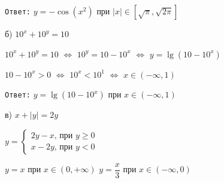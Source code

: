 \documentclass[12pt]{article}
\begin{document}
	{\tt Ответ:} $y=-\cos(x^2)$ при $|x|\in [\sqrt{\pi},\sqrt{2\pi}]$
	
	\quad б) $10^x + 10^y = 10$
	
	$10^x + 10^y = 10$ $\Leftrightarrow$ $10^y = 10-10^x$ $\Leftrightarrow$ $y = \lg (10-10^x)$
	
	$10-10^x>0$ $\Leftrightarrow$ $10^x<10^1$ $\Leftrightarrow$ $x\in (-\infty, 1)$
	
	{\tt Ответ:} $y = \lg(10-10^x)$ при $x\in (-\infty, 1)$
	
	\quad в) $x+|y| = 2y$ 
	
	$
	y = \begin{cases}
		2y -x \text{, при } y\ge 0 \\
		x - 2y \text{, при } y<0	
	\end{cases} 
	$
	
	$y = x$ при $x \in (0, +\infty)$ \quad $y=\dfrac{x}{3}$ при $x\in (-\infty, 0)$
	
	
	
	
	
	
	
	
	
	
	
\end{document}
